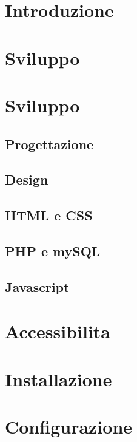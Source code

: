 \documentclass{article}
\begin{document}
\tableofcontents

\newpage

\section{Introduzione}



\section{Sviluppo}



\section{Sviluppo}
\subsection{Progettazione}


\subsection{Design}



\subsection{HTML e CSS}



\subsection{PHP e mySQL}



\subsection{Javascript}


\section{Accessibilita}



\section{Installazione}


\section{Configurazione}

\end{document}
